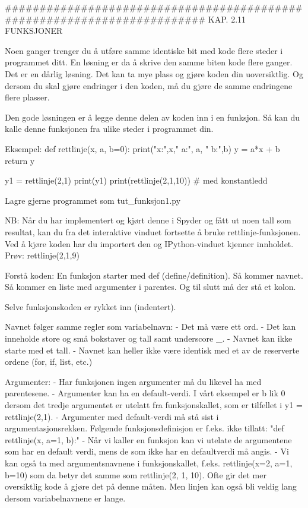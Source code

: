 \documentclass[a4paper,11pt,utf8]{book}
\begin{document}
######################################################################## 
KAP. 2.11  FUNKSJONER

Noen ganger trenger du å utføre samme identiske bit med kode 
flere steder i programmet ditt.
En løsning er da å skrive den samme biten kode flere ganger.
Det er en dårlig løsning.
Det kan ta mye plass og gjøre koden din uoversiktlig. 
Og dersom du skal gjøre endringer i den koden, 
må du gjøre de samme endringene flere plasser. 

Den gode løsningen er å legge denne delen av koden inn i en funksjon. 
Så kan du kalle denne funksjonen fra ulike steder i programmet din.

Eksempel:
def rettlinje(x, a, b=0):
    print("x:",x,"  a:", a, "  b:",b)
    y = a*x + b
    return y
    
y1 = rettlinje(2,1)
print(y1)
print(rettlinje(2,1,10))   # med konstantledd


Lagre gjerne programmet som tut_funksjon1.py 

NB: Når du har implementert og kjørt denne i Spyder og fått ut noen tall som resultat, 
kan du fra det interaktive vinduet fortsette å bruke rettlinje-funksjonen.
Ved å kjøre koden har du importert den og IPython-vinduet kjenner innholdet. 
Prøv:
rettlinje(2,1,9) 


Forstå koden: 
En funksjon starter med def (define/definition). 
Så kommer navnet. 
Så kommer en liste med argumenter i parentes. 
Og til slutt må der stå et kolon. 

Selve funksjonskoden er rykket inn (indentert).

Navnet følger samme regler som variabelnavn: 
- Det må være ett ord.
- Det kan inneholde store og små bokstaver og tall samt underscore _.
- Navnet kan ikke starte med et tall.
- Navnet kan heller ikke være identisk med et av de reserverte ordene (for, if, list, etc.) 

Argumenter:
- Har funksjonen ingen argumenter må du likevel ha med parentesene. 
- Argumenter kan ha en default-verdi. 
    I vårt eksempel er b lik 0 dersom det tredje argumentet er utelatt fra 
    funksjonskallet, som er tilfellet i y1 = rettlinje(2,1).
- Argumenter med default-verdi må stå sist i argumentasjonsrekken. 
  Følgende funksjonsdefinisjon er f.eks. ikke tillatt:  "def rettlinje(x, a=1, b):" 
- Når vi kaller en funksjon kan vi utelate de argumentene som har en default verdi, 
  mens de som ikke har en defaultverdi må angis. 
- Vi kan også ta med argumentsnavnene i funksjonskallet, f.eks. rettlinje(x=2, a=1, b=10) 
  som da betyr det samme som rettlinje(2, 1, 10). 
  Ofte gir det mer oversiktlig kode å gjøre det på denne måten. 
  Men linjen kan også bli veldig lang dersom variabelnavnene er lange. 
\end{document}
